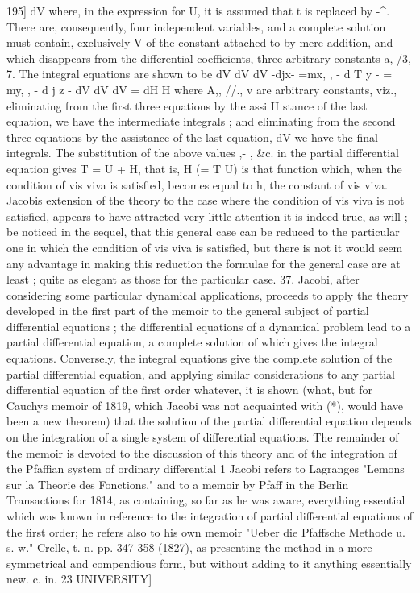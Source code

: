\documentclass[12pt,a4paper]{article}
\theoremstyle{definition}
\begin{document}
195]
dV
where, in the expression for U, it is assumed that t is replaced by -^. There are,
consequently, four independent variables, and a complete solution must contain, exclusively
V
of the constant attached to by mere addition, and which disappears from the
differential coefficients, three arbitrary constants a, /3, 7. The integral equations are
shown to be
dV dV dV
-djx- =mx,
,
-
d
T
y
- = my,
,
-
d
j
z
-
dV dV dV
=
dH
H
where A,, //., v are arbitrary constants, viz., eliminating from the first three equations
by the assi H stance of the last equation, we have the intermediate integrals ; and
eliminating from the second three equations by the assistance of the last equation,
dV
we have the final integrals. The substitution of the above values ,- , &c. in the
partial differential equation gives T = U + H, that is, H (= T U) is that function
which, when the condition of vis viva is satisfied, becomes equal to h, the constant of
vis viva.
Jacobis extension of the theory to the case where the condition of vis viva is
not satisfied, appears to have attracted very little attention it is indeed true, as will
;
be noticed in the sequel, that this general case can be reduced to the particular one
in which the condition of vis viva is satisfied, but there is not it would seem any
advantage in making this reduction the formulae for the general case are at least
;
quite as elegant as those for the particular case.
37. Jacobi, after considering some particular dynamical applications, proceeds to
apply the theory developed in the first part of the memoir to the general subject of
partial differential equations ; the differential equations of a dynamical problem lead to
a partial differential equation, a complete solution of which gives the integral equations.
Conversely, the integral equations give the complete solution of the partial differential
equation, and applying similar considerations to any partial differential equation of the
first order whatever, it is shown (what, but for Cauchys memoir of 1819, which
Jacobi was not acquainted with (*), would have been a new theorem) that the solution
of the partial differential equation depends on the integration of a single system
of differential equations. The remainder of the memoir is devoted to the discussion
of this theory and of the integration of the Pfaffian system of ordinary differential
1 Jacobi refers to Lagranges "Lemons sur la Theorie des Fonctions," and to a memoir by Pfaff in the
Berlin Transactions for 1814, as containing, so far as he was aware, everything essential which was
known in reference to the integration of partial differential equations of the first order; he refers also to
his own memoir "Ueber die Pfaffsche Methode u. s. w." Crelle, t. n. pp. 347 358 (1827), as presenting the
method in a more symmetrical and compendious form, but without adding to it anything essentially new.
c. in. 23
UNIVERSITY]
\end{document}
